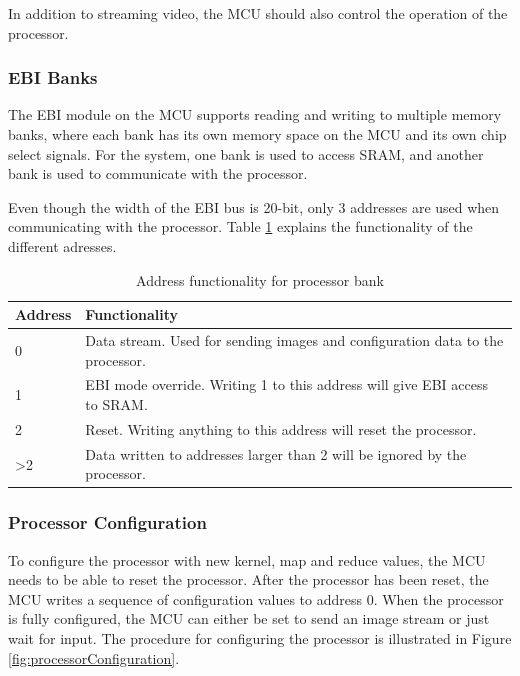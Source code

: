 In addition to streaming video, the MCU should also control the operation of the processor.

\subsubsection{EBI Banks}
The EBI module on the MCU supports reading and writing to multiple memory banks, where each bank has its own memory space on the MCU and its own chip select signals. For the system, one bank is used to access SRAM, and another bank is used to communicate with the processor.

Even though the width of the EBI bus is 20-bit, only 3 addresses are used when communicating with the processor. Table \ref{ebi_processor_addresses} explains the functionality of the different adresses.

\begin{table}[h!]
\centering
	\begin{tabular}{ l p{10cm} }
		
		Address & Functionality \\ \hline
		0 & Data stream. Used for sending images and configuration data to the processor. \\ \hline
		1 & EBI mode override. Writing 1 to this address will give EBI access to SRAM. \\ \hline
		2 & Reset. Writing anything to this address will reset the processor. \\ \hline
		>2 & Data written to addresses larger than 2 will be ignored by the processor.
	\end{tabular}
	\caption{Address functionality for processor bank}
	\label{ebi_processor_addresses}
\end{table}


\subsubsection{Processor Configuration}
To configure the processor with new kernel, map and reduce values, the MCU needs to be able to reset the processor. After the processor has been reset, the MCU writes a sequence of configuration values to address 0. When the processor is fully configured, the MCU can either be set to send an image stream or just wait for input. The procedure for configuring the processor is illustrated in Figure \ref{fig:processorConfiguration}.

